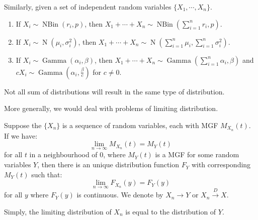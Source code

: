 \documentclass{huhtakm-template-book-v2}
\DeclareMathOperator{\N}{N}
\DeclareMathOperator{\NBin}{NBin}
\DeclareMathOperator{\Gam}{Gamma}
\begin{document}
\begin{eg}
	Similarly, given a set of independent random variables $\{X_{1},\cdots,X_{n}\}$.
	\begin{enumerate}
		\item If $X_{i}\sim\NBin(r_{i},p)$, then $X_{1}+\cdots+X_{n}\sim\NBin(\sum_{i=1}^{n}r_{i},p)$.
		\item If $X_{i}\sim\N(\mu_{i},\sigma_{i}^{2})$, then $X_{1}+\cdots+X_{n}\sim\N(\sum_{i=1}^{n}\mu_{i},\sum_{i=1}^{n}\sigma_{i}^{2})$.
		\item If $X_{i}\sim\Gam(\alpha_{i},\beta)$, then $X_{1}+\cdots+X_{n}\sim\Gam(\sum_{i=1}^{n}\alpha_{i},\beta)$ and $cX_{i}\sim\Gam(\alpha_{i},\frac{\beta}{c})$ for $c\neq 0$.
	\end{enumerate}
\end{eg}
\begin{rem}
	Not all sum of distributions will result in the same type of distribution.
\end{rem}
More generally, we would deal with problems of limiting distribution.
\begin{thm}
	Suppose the $\{X_{n}\}$ is a sequence of random variables, each with MGF $M_{X_{n}}(t)$. If we have:
	\begin{equation*}
		\lim_{n\to\infty}M_{X_{n}}(t)=M_{Y}(t)
	\end{equation*}
	for all $t$ in a neighbourhood of $0$, where $M_{Y}(t)$ is a MGF for some random variables $Y$, then there is an unique distribution function $F_{Y}$ with corresponding $M_{Y}(t)$ such that:
	\begin{equation*}
		\lim_{n\to\infty}F_{X_{n}}(y)=F_{Y}(y)
	\end{equation*}
	for all $y$ where $F_{Y}(y)$ is continuous. We denote by $X_{n}\to Y$ or $X_{n}\xrightarrow{D}X$.
\end{thm}
\begin{rem}
	Simply, the limiting distribution of $X_{n}$ is equal to the distribution of $Y$.
\end{rem}
\end{document}
